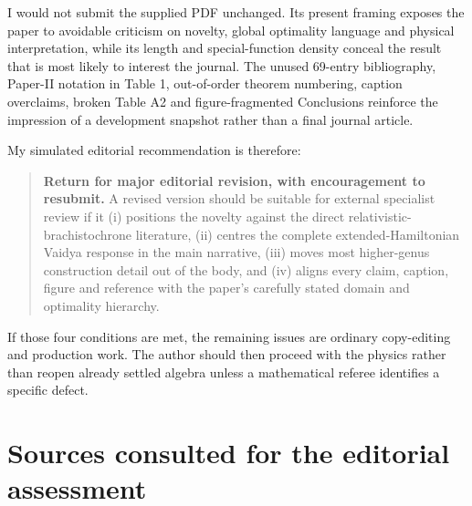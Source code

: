 \documentclass[11pt,a4paper]{article}
\begin{document}
I would not submit the supplied PDF unchanged.  Its present framing exposes the paper to avoidable
criticism on novelty, global optimality language and physical interpretation, while its length and
special-function density conceal the result that is most likely to interest the journal.  The
unused 69-entry bibliography, Paper-II notation in Table 1, out-of-order theorem numbering,
caption overclaims, broken Table A2 and figure-fragmented Conclusions reinforce the impression of a
development snapshot rather than a final journal article.

My simulated editorial recommendation is therefore:

\begin{quote}
\textbf{Return for major editorial revision, with encouragement to resubmit.}  A revised version
should be suitable for external specialist review if it (i) positions the novelty against the
direct relativistic-brachistochrone literature, (ii) centres the complete extended-Hamiltonian
Vaidya response in the main narrative, (iii) moves most higher-genus construction detail out of
the body, and (iv) aligns every claim, caption, figure and reference with the paper's carefully
stated domain and optimality hierarchy.
\end{quote}

If those four conditions are met, the remaining issues are ordinary copy-editing and production
work.  The author should then proceed with the physics rather than reopen already settled algebra
unless a mathematical referee identifies a specific defect.

\bigskip
\section*{Sources consulted for the editorial assessment}
\end{document}
